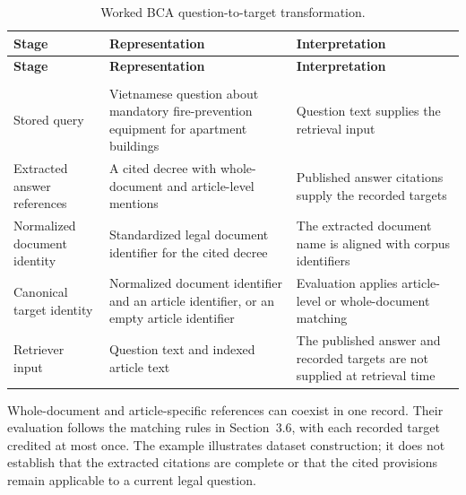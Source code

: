 \begingroup
\small
\setlength{\tabcolsep}{3pt}
\renewcommand{\arraystretch}{1.18}
\begin{longtable}{>{\raggedright\arraybackslash}p{3.429cm}>{\raggedright\arraybackslash}p{5.828cm}>{\raggedright\arraybackslash}p{6.084cm}}
\caption[Worked BCA question-to-target transformation.]{Worked BCA question-to-target transformation.}\label{tab:4.2}\\
\toprule
\textbf{Stage} & \textbf{Representation} & \textbf{Interpretation} \\
\midrule
\endfirsthead
\toprule
\textbf{Stage} & \textbf{Representation} & \textbf{Interpretation} \\
\midrule
\endhead
\midrule
\multicolumn{3}{r}{\footnotesize Continued on next page}\\
\endfoot
\bottomrule
\endlastfoot
Stored query & Vietnamese question about mandatory fire-prevention equipment for apartment buildings & Question text supplies the retrieval input \\
Extracted answer references & A cited decree with whole-document and article-level mentions & Published answer citations supply the recorded targets \\
Normalized document identity & Standardized legal document identifier for the cited decree & The extracted document name is aligned with corpus identifiers \\
Canonical target identity & Normalized document identifier and an article identifier, or an empty article identifier & Evaluation applies article-level or whole-document matching \\
Retriever input & Question text and indexed article text & The published answer and recorded targets are not supplied at retrieval time \\
\end{longtable}
\endgroup

Whole-document and article-specific references can coexist in one record. Their evaluation follows the matching rules in Section~3.6, with each recorded target credited at most once. The example illustrates dataset construction; it does not establish that the extracted citations are complete or that the cited provisions remain applicable to a current legal question.
